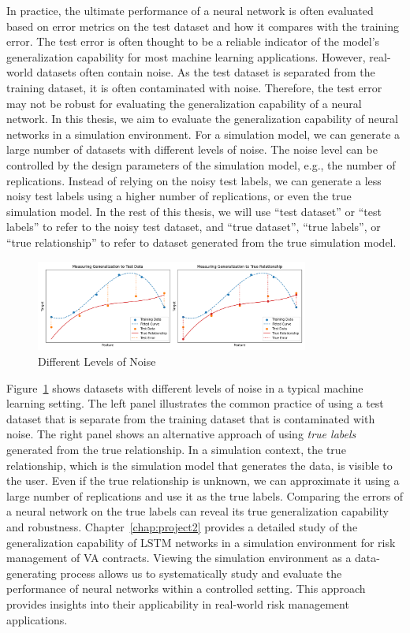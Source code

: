 In practice, the ultimate performance of a neural network is often evaluated based on error metrics on the test dataset and how it compares with the training error.
The test error is often thought to be a reliable indicator of the model's generalization capability for most machine learning applications.
However, real-world datasets often contain noise.
As the test dataset is separated from the training dataset, it is often contaminated with noise.
Therefore, the test error may not be robust for evaluating the generalization capability of a neural network.
In this thesis, we aim to evaluate the generalization capability of neural networks in a simulation environment.
For a simulation model, we can generate a large number of datasets with different levels of noise.
The noise level can be controlled by the design parameters of the simulation model, e.g., the number of replications.
Instead of relying on the noisy test labels, we can generate a less noisy test labels using a higher number of replications, or even the true simulation model.
In the rest of this thesis, we will use ``test dataset'' or ``test labels'' to refer to the noisy test dataset, and ``true dataset'', ``true labels'', or ``true relationship'' to refer to dataset generated from the true simulation model.

\begin{figure}[ht!] 
    \centering
    \includegraphics[width=0.8\textwidth]{./project2/figures/datasets.png}
    \caption{Different Levels of Noise}
    \label{fig:datasets}
\end{figure}

Figure~\ref{fig:datasets} shows datasets with different levels of noise in a typical machine learning setting.
The left panel illustrates the common practice of using a test dataset that is separate from the training dataset that is contaminated with noise.
The right panel shows an alternative approach of using \textit{true labels} generated from the true relationship.
In a simulation context, the true relationship, which is the simulation model that generates the data, is visible to the user.
Even if the true relationship is unknown, we can approximate it using a large number of replications and use it as the true labels.
Comparing the errors of a neural network on the true labels can reveal its true generalization capability and robustness.
Chapter~\ref{chap:project2} provides a detailed study of the generalization capability of LSTM networks in a simulation environment for risk management of VA contracts.
Viewing the simulation environment as a data-generating process allows us to systematically study and evaluate the performance of neural networks within a controlled setting.
This approach provides insights into their applicability in real-world risk management applications.

